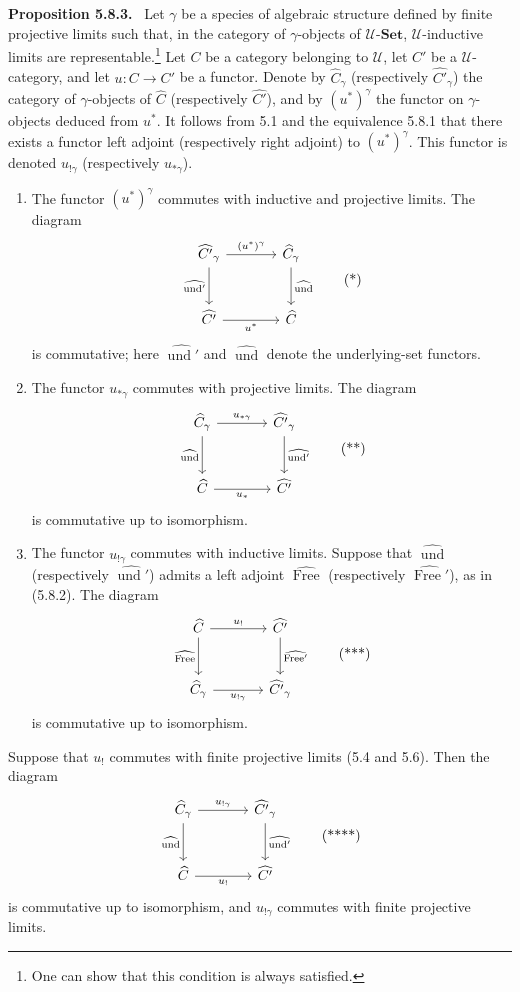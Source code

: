 \documentclass[11pt]{article}
\newcommand{\U}{\mathcal{U}}
\newcommand{\Set}{\mathbf{Set}}
\newcommand{\esj}{\operatorname{und}}
\newcommand{\Lib}{\operatorname{Free}}
\newenvironment{statement}[1]{\par\medskip\noindent\textbf{#1.}\ }{\par\medskip}
\begin{document}
\begin{statement}{Proposition 5.8.3}
Let $\gamma$ be a species of algebraic structure defined by finite projective limits such that, in the category of $\gamma$-objects of $\U$-$\Set$, $\U$-inductive limits are representable.\footnote{One can show that this condition is always satisfied.} Let $C$ be a category belonging to $\U$, let $C'$ be a $\U$-category, and let $u:C\to C'$ be a functor. Denote by $\widehat C_\gamma$ (respectively $\widehat{C'}_\gamma$) the category of $\gamma$-objects of $\widehat C$ (respectively $\widehat{C'}$), and by $(u^*)^\gamma$ the functor on $\gamma$-objects deduced from $u^*$. It follows from 5.1 and the equivalence 5.8.1 that there exists a functor left adjoint (respectively right adjoint) to $(u^*)^\gamma$. This functor is denoted $u_{!\gamma}$ (respectively $u_{*\gamma}$).
\begin{enumerate}[label=\arabic*)]
\item The functor $(u^*)^\gamma$ commutes with inductive and projective limits. The diagram
\[
\begin{tikzcd}[column sep=large,row sep=large]
\widehat{C'}_\gamma\arrow[r,"(u^*)^\gamma"]\arrow[d,"\widehat{\esj'}"']&\widehat C_\gamma\arrow[d,"\widehat{\esj}"]\\
\widehat{C'}\arrow[r,"u^*"']&\widehat C
\end{tikzcd}
\tag{*}
\]
is commutative; here $\widehat{\esj'}$ and $\widehat{\esj}$ denote the underlying-set functors.
\item The functor $u_{*\gamma}$ commutes with projective limits. The diagram
\[
\begin{tikzcd}[column sep=large,row sep=large]
\widehat C_\gamma\arrow[r,"u_{*\gamma}"]\arrow[d,"\widehat{\esj}"']&\widehat{C'}_\gamma\arrow[d,"\widehat{\esj'}"]\\
\widehat C\arrow[r,"u_*"']&\widehat{C'}
\end{tikzcd}
\tag{**}
\]
is commutative up to isomorphism.
\item The functor $u_{!\gamma}$ commutes with inductive limits. Suppose that $\widehat{\esj}$ (respectively $\widehat{\esj'}$) admits a left adjoint $\widehat{\Lib}$ (respectively $\widehat{\Lib'}$), as in (5.8.2). The diagram
\[
\begin{tikzcd}[column sep=large,row sep=large]
\widehat C\arrow[r,"u_!"]\arrow[d,"\widehat{\Lib}"']&\widehat{C'}\arrow[d,"\widehat{\Lib'}"]\\
\widehat C_\gamma\arrow[r,"u_{!\gamma}"']&\widehat{C'}_\gamma
\end{tikzcd}
\tag{***}
\]
is commutative up to isomorphism.
\end{enumerate}
Suppose that $u_!$ commutes with finite projective limits (5.4 and 5.6). Then the diagram
\[
\begin{tikzcd}[column sep=large,row sep=large]
\widehat C_\gamma\arrow[r,"u_{!\gamma}"]\arrow[d,"\widehat{\esj}"']&\widehat{C'}_\gamma\arrow[d,"\widehat{\esj'}"]\\
\widehat C\arrow[r,"u_!"']&\widehat{C'}
\end{tikzcd}
\tag{****}
\]
is commutative up to isomorphism, and $u_{!\gamma}$ commutes with finite projective limits.
\end{statement}
\end{document}
